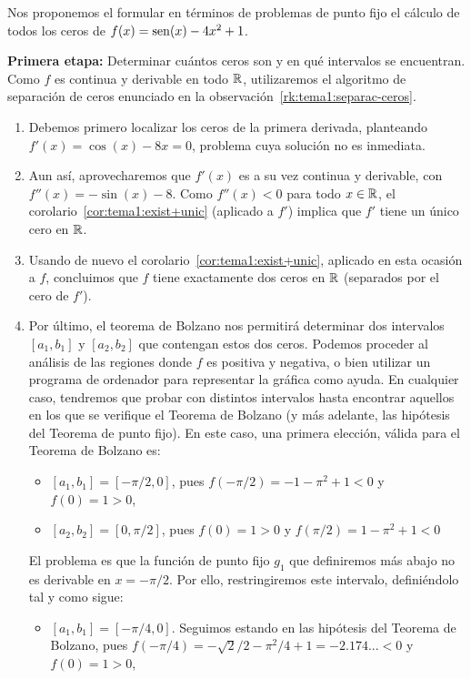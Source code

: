 \begin{example}
  Nos proponemos el formular en términos de problemas de punto fijo el
  cálculo de todos los ceros de $f(x)=\operatorname{sen}(x)-4x^2+1$. 

  
  \textbf{Primera etapa:} Determinar cuántos ceros son y en qué
  intervalos se encuentran. Como $f$ es continua y derivable en todo
  $\operatorname{{\mathbb R}}$, utilizaremos el algoritmo de separación de ceros enunciado
  en la observación~\ref{rk:tema1:separac-ceros}.
  \begin{enumerate}
  \item Debemos primero localizar los ceros de la primera
    derivada, planteando $f'(x)=\cos(x)-8x=0$, problema cuya solución
    no es inmediata.
  \item Aun así, aprovecharemos que $f'(x)$ es a su vez continua y
    derivable, con $f''(x)=-\sin(x)-8$. Como $f''(x)<0$ para todo
    $x\in\operatorname{{\mathbb R}}$, el corolario~\ref{cor:tema1:exist+unic} (aplicado a
    $f'$) implica que $f'$ tiene un único cero en $\operatorname{{\mathbb R}}$.
  \item Usando de nuevo el
    corolario~\ref{cor:tema1:exist+unic}, aplicado en esta ocasión a
    $f$, concluimos que $f$ tiene exactamente dos ceros en $\operatorname{{\mathbb R}}$
    (separados por el cero de $f'$).
  \item Por último, el teorema de Bolzano nos permitirá determinar dos
    intervalos $[a_1,b_1]$ y $[a_2,b_2]$ que contengan estos dos
    ceros. Podemos proceder al análisis de las regiones donde $f$ es
    positiva y negativa, o bien utilizar un programa de ordenador para
    representar la gráfica como ayuda. En cualquier caso, tendremos
    que probar con distintos intervalos hasta encontrar aquellos en
    los que se verifique el Teorema de Bolzano (y más adelante, las
    hipótesis del Teorema de punto fijo). En este caso, una primera
    elección, válida para el Teorema de Bolzano es:
    \begin{itemize}
    \item $[a_1,b_1]=[-\pi/2, 0]$, pues $f(-\pi/2)=-1-\pi^2+1<0$ y
      $f(0)=1>0$,
    \item $[a_2,b_2]=[0, \pi/2]$, pues $f(0)=1>0$ y $f(\pi/2)= 1-\pi^2+1<0$
    \end{itemize}
    El problema es que la función de punto fijo $g_1$ que definiremos
    más abajo no es derivable en $x=-\pi/2$. Por ello, restringiremos
    este intervalo, definiéndolo tal y como sigue:
    \begin{itemize}
    \item $[a_1,b_1]=[-\pi/4, 0]$. Seguimos estando en las hipótesis
      del Teorema de Bolzano, pues $f(-\pi/4)=
      -\sqrt{2}/2-\pi^2/4+1=-2.174...<0$ y $f(0)=1>0$,
    \end{itemize}
  \end{enumerate}


\end{example}
